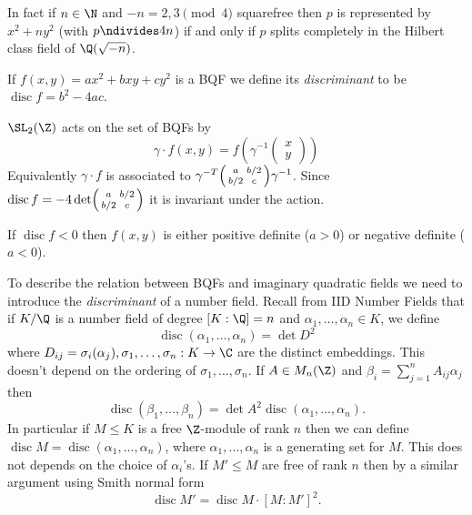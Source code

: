 \documentclass[a4paper]{article}
\DeclareMathOperator{\disc}{disc} %
\begin{document}
In fact if \(n \in \N\) and \(-n = 2, 3 \pmod 4\) squarefree then \(p\) is represented by \(x^2 + ny^2\) (with \(p \ndivides 4n\)) if and only if \(p\) splits completely in the Hilbert class field of \(\Q(\sqrt{-n})\).

\begin{definition}
  If \(f(x, y) = ax^2 + bxy + cy^2\) is a BQF we define its \emph{discriminant} to be \(\disc f = b^2 - 4ac\).
\end{definition}

\(\SL_2(\Z)\) acts on the set of BQFs by
\[
  \gamma \cdot f(x, y) = f(\gamma^{-1}
  \begin{pmatrix}
    x \\
    y
  \end{pmatrix})
\]
Equivalently \(\gamma \cdot f\) is associated to \(\gamma^{-T}
\begin{psmallmatrix}
  a & b/2 \\
  b/2 & c
\end{psmallmatrix}
\gamma^{-1}\). Since \(\disc f = -4 \det \begin{psmallmatrix}
  a & b/2 \\
  b/2 & c
\end{psmallmatrix}
\) it is invariant under the action.

\begin{remark}
  If \(\disc f < 0\) then \(f(x, y)\) is either positive definite (\(a > 0\)) or negative definite (\(a < 0\)).
\end{remark}

To describe the relation between BQFs and imaginary quadratic fields we need to introduce the \emph{discriminant} of a number field. Recall from IID Number Fields that if \(K/\Q\) is a number field of degree \([K: \Q] = n\) and \(\alpha_1, \dots, \alpha_n \in K\), we define
\[
  \disc (\alpha_1, \dots, \alpha_n) = \det D^2
\]
where \(D_{ij} = \sigma_i(\alpha_j), \sigma_1, \dots, \sigma_n: K \to \C\) are the distinct embeddings. This doesn't depend on the ordering of \(\sigma_1, \dots, \sigma_n\). If \(A \in M_n(\Z)\) and \(\beta_i = \sum_{j = 1}^n A_{ij} \alpha_j\) then
\[
  \disc (\beta_1, \dots, \beta_n) = \det A^2 \disc(\alpha_1, \dots, \alpha_n).
\]
In particular if \(M \leq K\) is a free \(\Z\)-module of rank \(n\) then we can define \(\disc M = \disc(\alpha_1, \dots, \alpha_n)\), where \(\alpha_1, \dots, \alpha_n\) is a generating set for \(M\). This does not depends on the choice of \(\alpha_i\)'s. If \(M' \leq M\) are free of rank \(n\) then by a similar argument using Smith normal form
\[
  \disc M' = \disc M \cdot [M : M']^2.
\]
\end{document}
